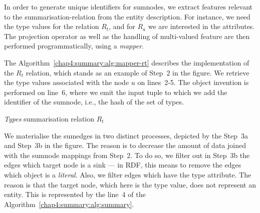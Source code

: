 
In order to generate unique identifiers for sumnodes, we extract features relevant to the \gls{summarisation-relation} from the entity description. For instance, we need the type values for the relation $R_t$, and for $R_a$ we are interested in the attributes. The projection operator as well as the handling of multi-valued feature are then performed programmatically, using a \emph{mapper}.

The Algorithm~\ref{chap4:summary:alg:mapper-rt} describes the implementation of the $R_t$ relation, which stands as an example of Step~2 in the figure. We retrieve the type values associated with the node $u$ on lines~2-5. The object invention is performed on line~6, where we emit the input tuple to which we add the identifier of the sumnode, i.e., the hash of the set of types.

\begin{algorithm}
	\DontPrintSemicolon
	\BlankLine
	\caption{\emph{Types} summarisation relation $R_t$}
	\label{chap4:summary:alg:mapper-rt}
\end{algorithm}

\label{chap4:summary:algo:edge-materialisation}

We materialise the sumedges in two distinct processes, depicted by the Step~3a and Step~3b in the figure. The reason is to decrease the amount of data joined with the sumnode mappings from Step~2. To do so, we filter out in Step~3b the edges which target node is a sink --- in RDF, this means to remove the edges which object is a \emph{literal}. Also, we filter edges which have the type attribute. The reason is that the target node, which here is the type value, does not represent an entity. This is represented by the line~4 of the Algorithm~\ref{chap4:summary:alg:summary}.

